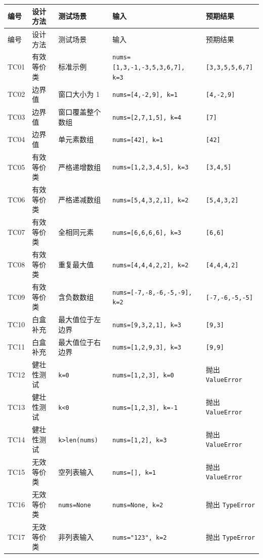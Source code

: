 \documentclass[a4paper,UTF8,fontset=none]{ctexart}
\begin{document}
\begin{longtable}{>{\raggedright\arraybackslash}p{1.2cm} >{\raggedright\arraybackslash}p{2.3cm} >{\raggedright\arraybackslash}p{2.7cm} >{\raggedright\arraybackslash}p{4.7cm} >{\raggedright\arraybackslash}p{2.7cm}}
\toprule
编号 & 设计方法 & 测试场景 & 输入 & 预期结果 \\
\midrule
\endfirsthead
\toprule
编号 & 设计方法 & 测试场景 & 输入 & 预期结果 \\
\midrule
\endhead
TC01 & 有效等价类 & 标准示例 & \texttt{nums=[1,3,-1,-3,5,3,6,7], k=3} & \texttt{[3,3,5,5,6,7]} \\
TC02 & 边界值 & 窗口大小为 1 & \texttt{nums=[4,-2,9], k=1} & \texttt{[4,-2,9]} \\
TC03 & 边界值 & 窗口覆盖整个数组 & \texttt{nums=[2,7,1,5], k=4} & \texttt{[7]} \\
TC04 & 边界值 & 单元素数组 & \texttt{nums=[42], k=1} & \texttt{[42]} \\
TC05 & 有效等价类 & 严格递增数组 & \texttt{nums=[1,2,3,4,5], k=3} & \texttt{[3,4,5]} \\
TC06 & 有效等价类 & 严格递减数组 & \texttt{nums=[5,4,3,2,1], k=2} & \texttt{[5,4,3,2]} \\
TC07 & 有效等价类 & 全相同元素 & \texttt{nums=[6,6,6,6], k=3} & \texttt{[6,6]} \\
TC08 & 有效等价类 & 重复最大值 & \texttt{nums=[4,4,4,2,2], k=2} & \texttt{[4,4,4,2]} \\
TC09 & 有效等价类 & 含负数数组 & \texttt{nums=[-7,-8,-6,-5,-9], k=2} & \texttt{[-7,-6,-5,-5]} \\
TC10 & 白盒补充 & 最大值位于左边界 & \texttt{nums=[9,3,2,1], k=3} & \texttt{[9,3]} \\
TC11 & 白盒补充 & 最大值位于右边界 & \texttt{nums=[1,2,9,3], k=3} & \texttt{[9,9]} \\
TC12 & 健壮性测试 & \texttt{k=0} & \texttt{nums=[1,2,3], k=0} & 抛出 \texttt{ValueError} \\
TC13 & 健壮性测试 & \texttt{k<0} & \texttt{nums=[1,2,3], k=-1} & 抛出 \texttt{ValueError} \\
TC14 & 健壮性测试 & \texttt{k>len(nums)} & \texttt{nums=[1,2], k=3} & 抛出 \texttt{ValueError} \\
TC15 & 无效等价类 & 空列表输入 & \texttt{nums=[], k=1} & 抛出 \texttt{ValueError} \\
TC16 & 无效等价类 & \texttt{nums=None} & \texttt{nums=None, k=2} & 抛出 \texttt{TypeError} \\
TC17 & 无效等价类 & 非列表输入 & \texttt{nums="123", k=2} & 抛出 \texttt{TypeError} \\

\end{longtable}
\end{document}
